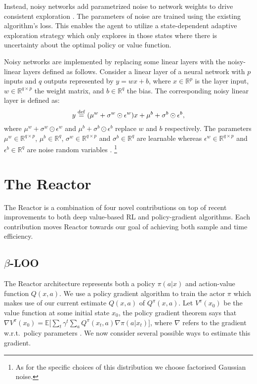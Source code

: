 \documentclass{article}
\newcommand{\E}{{\mathbb E}}
\newcommand{\eqdef}{\stackrel{\rm def}{=}}
\begin{document}
Instead, noisy networks add parametrized noise to network weights to drive 
consistent exploration \citep{fortunato2017noisy}.
The parameters of noise are trained using the existing algorithm's loss. This 
enables the agent to utilize a 
state-dependent adaptive exploration strategy which only explores in those 
states where there is uncertainty about the optimal policy or value function. 

Noisy networks are implemented by replacing some linear layers with the 
noisy-linear layers defined as 
follows. Consider a linear layer of a neural network with $p$ inputs and $q$ 
outputs represented by 
$y = wx + b$, where $x\in \mathbb{R}^{p}$ is the layer input, 
$w\in\mathbb{R}^{q\times p}$ 
the weight matrix, and $b\in\mathbb{R}^q$ the bias. The corresponding noisy 
linear layer is defined as:
\begin{equation}\label{eq:param}
y\eqdef(\mu^w+\sigma^w\odot\epsilon^w) x+ \mu^b  +\sigma^b\odot\epsilon^b ,
\end{equation}
where  $\mu^w+\sigma^w\odot\epsilon^w$ and $\mu^b  +\sigma^b\odot\epsilon^b$ 
replace $w$ and $b$ respectively.  The parameters 
$\mu^w\in \mathbb{R}^{q\times p}$, $\mu^b\in \mathbb{R}^{q}$, $\sigma^w\in 
\mathbb{R}^{q\times p}$ and $\sigma^b\in \mathbb{R}^{q}$ are learnable whereas 
$\epsilon^w\in \mathbb{R}^{q\times p}$  and $\epsilon^b\in \mathbb{R}^{q}$ are 
noise random variables \citep{fortunato2017noisy}.
\footnote{As for the specific choices of this distribution we choose factorised 
Gaussian 
noise.}
\fi 

\section{The Reactor}\label{sec:reactor}
The Reactor is a combination of four novel contributions on top of recent 
improvements to both 
deep value-based RL and policy-gradient algorithms. 
Each contribution moves Reactor towards our goal of achieving both sample and time efficiency.

\subsection{$\beta$-LOO}\label{sec:betaloo}

The Reactor architecture represents both a policy $\pi(a|x)$ and action-value function 
$Q(x,a)$. We use a policy gradient algorithm to train the actor $\pi$ which 
makes use of our current estimate $Q(x,a)$ of $Q^{\pi}(x,a)$.  
Let $V^{\pi}(x_0)$ be the value function at some initial state $x_0$, the 
policy gradient theorem says that $\nabla 
V^{\pi}(x_0) = \E\big[\sum_t \gamma^t \sum_a Q^{\pi}(x_t,a) \nabla \pi(a|x_t) 
\big]$, where $\nabla$ refers to the gradient w.r.t.~policy parameters \citep{Sutton00policygradient}. We now 
consider several possible ways to estimate this gradient.
\end{document}
